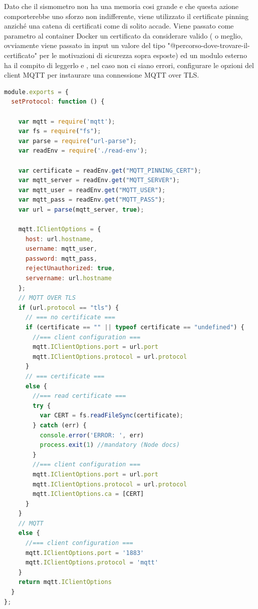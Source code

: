 \documentclass[a4paper,10pt]{memoir}
\begin{document}
Dato che il sismometro non ha una memoria cosi grande e che questa azione comporterebbe uno sforzo non indifferente, viene utilizzato il certificate pinning anziché una catena di certificati come di solito accade.
Viene passato come parametro al container Docker un certificato da considerare valido ( o meglio, ovviamente viene passato in input un valore del tipo "@percorso-dove-trovare-il-certificato" per le motivazioni di sicurezza sopra esposte) ed un modulo esterno ha il compito di leggerlo e , nel caso non ci siano errori, configurare le opzioni del client MQTT per instaurare una connessione MQTT over TLS.

\begin{lstlisting}[language=Javascript]
module.exports = {
  setProtocol: function () {

    var mqtt = require('mqtt');
    var fs = require("fs");
    var parse = require("url-parse");
    var readEnv = require('./read-env');

    var certificate = readEnv.get("MQTT_PINNING_CERT");
    var mqtt_server = readEnv.get("MQTT_SERVER");
    var mqtt_user = readEnv.get("MQTT_USER");
    var mqtt_pass = readEnv.get("MQTT_PASS");
    var url = parse(mqtt_server, true);

    mqtt.IClientOptions = {
      host: url.hostname,
      username: mqtt_user,
      password: mqtt_pass,
      rejectUnauthorized: true,
      servername: url.hostname
    };
    // MQTT OVER TLS
    if (url.protocol == "tls") {
      // === no certificate ===
      if (certificate == "" || typeof certificate == "undefined") {
        //=== client configuration ===
        mqtt.IClientOptions.port = url.port
        mqtt.IClientOptions.protocol = url.protocol
      }
      // === certificate ===
      else {
        //=== read certificate === 
        try {
          var CERT = fs.readFileSync(certificate);
        } catch (err) {
          console.error('ERROR: ', err)
          process.exit(1) //mandatory (Node docs)
        }
        //=== client configuration ===
        mqtt.IClientOptions.port = url.port
        mqtt.IClientOptions.protocol = url.protocol
        mqtt.IClientOptions.ca = [CERT]
      }
    }
    // MQTT
    else {
      //=== client configuration ===
      mqtt.IClientOptions.port = '1883'
      mqtt.IClientOptions.protocol = 'mqtt'
    }
    return mqtt.IClientOptions
  }
};

\end{lstlisting}

\clearpage


\end{document}
